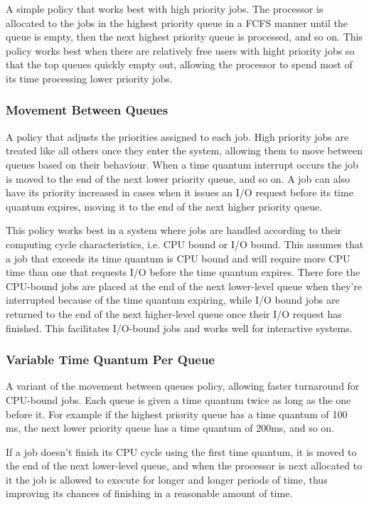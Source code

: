 \documentclass[12pt letter]{report}
\begin{document}
A simple policy that works best with high priority jobs. The
processor is allocated to the jobs in the highest priority queue in a
FCFS manner until the queue is empty, then the next highest priority
queue is processed, and so on. This policy works best when there are
relatively free users with hight priority jobs so that the top queues
quickly empty out, allowing the processor to spend most of its time
processing lower priority jobs.

\subsubsection{Movement Between Queues}

A policy that adjusts the priorities assigned to each job. High
priority jobs are treated like all others once they enter the system,
allowing them to move between queues based on their behaviour. When a
time quantum interrupt occurs the job is moved to the end of the next
lower priority queue, and so on. A job can also have its priority
increased in cases when it issues an I/O request before its time
quantum expires, moving it to the end of the next higher priority queue.

This policy works best in a system where jobs are handled according
to  their computing cycle characteristics, i.e. CPU bound or I/O
bound. This assumes that a job that exceeds its time quantum is CPU
bound and will require more CPU time than one that requests I/O
before the time quantum expires. There fore the CPU-bound jobs are
placed at the end of the next lower-level queue when they're
interrupted because of the time quantum expiring, while I/O bound
jobs are returned to the end of the next higher-level queue once
their I/O request has finished. This facilitates I/O-bound jobs and
works well for interactive systems.

\subsubsection{Variable Time Quantum Per Queue}

A variant of the movement between queues policy, allowing faster
turnaround for CPU-bound jobs. Each queue is given a time quantum
twice as long as the one before it. For example if the highest
priority queue has a time quantum of 100 ms, the next lower priority
queue has a time quantum of 200ms, and so on.

If a job doesn't finish its CPU cycle using the first time quantum,
it is moved to the end of the next lower-level queue, and when the
processor is next allocated to it the job is allowed to execute for
longer and longer periods of time, thus improving its chances of
finishing in a reasonable amount of time.
\end{document}

